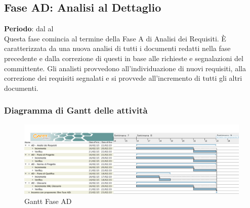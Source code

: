\subsection{Fase AD: Analisi al Dettaglio}
\textbf{Periodo}: dal  al  \\
Questa fase comincia al termine della Fase A di Analisi dei Requisiti. È caratterizzata da una nuova analisi di tutti i documenti redatti nella fase precedente e dalla correzione di questi in base alle richieste e segnalazioni del committente. Gli analisti provvedono all'individuazione di nuovi requisiti, alla correzione dei requisiti segnalati e si provvede all'incremento di tutti gli altri documenti.
\subsubsection{Diagramma di Gantt delle attività}
\begin{center}
	\begin{figure}[H]\centering
		\includegraphics[width=\textwidth]{PianoDiProgetto/Pics/FaseAD.png}
		\caption{Gantt Fase AD}
	\end{figure}
\end{center}
